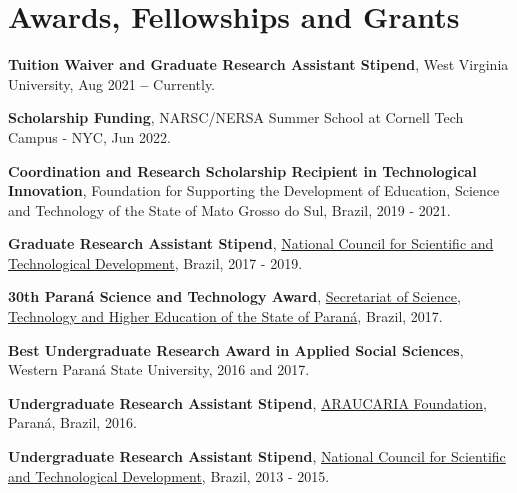\documentclass[letterpaper,11pt]{article}
\newcommand{\resumeSubHeadingListStart}{\begin{itemize}[leftmargin=0.15in, label={}]}
\newcommand{\resumeSubHeadingListEnd}{\end{itemize}}
\begin{document}
 
\section{Awards, Fellowships and Grants}
\vspace{3pt}

  \resumeSubHeadingListStart
    \small{\item{
        \textbf{Tuition Waiver and Graduate Research Assistant Stipend}{, West Virginia University, Aug 2021 \textbf{--} Currently.} \\ \vspace{2pt}

        \textbf{Scholarship Funding}{, NARSC/NERSA Summer School at Cornell Tech Campus - NYC, Jun 2022.} \\ \vspace{2pt}

        \textbf{Coordination and Research Scholarship Recipient in Technological Innovation}{, Foundation for Supporting the Development of Education, Science and Technology of the State of Mato Grosso do Sul, Brazil, 2019 - 2021.} \\ \vspace{2pt}
        
        \textbf{Graduate Research Assistant Stipend}{, \href{https://memoria.cnpq.br/pibic/}{National Council for Scientific and Technological Development}, Brazil, 2017 - 2019.} \\ \vspace{2pt}
        
        \textbf{30th Paraná Science and Technology Award}{, \href{https://www.seti.pr.gov.br/ppct/}{Secretariat of Science, Technology and Higher Education of the State of Paraná}, Brazil, 2017.} \\ \vspace{2pt}
        
        \textbf{Best Undergraduate Research Award in Applied Social Sciences}{, Western Paraná State University, 2016 and 2017.} \\ \vspace{2pt}
        
        \textbf{Undergraduate Research Assistant Stipend}{, \href{https://www.fappr.pr.gov.br/}{ARAUCARIA Foundation}, Paraná, Brazil, 2016.} \\ \vspace{2pt}

        \textbf{Undergraduate Research Assistant Stipend}{, \href{https://memoria.cnpq.br/pibic/}{National Council for Scientific and Technological Development}, Brazil, 2013 - 2015.} \\ \vspace{2pt}

    }}
  \resumeSubHeadingListEnd
\end{document}
